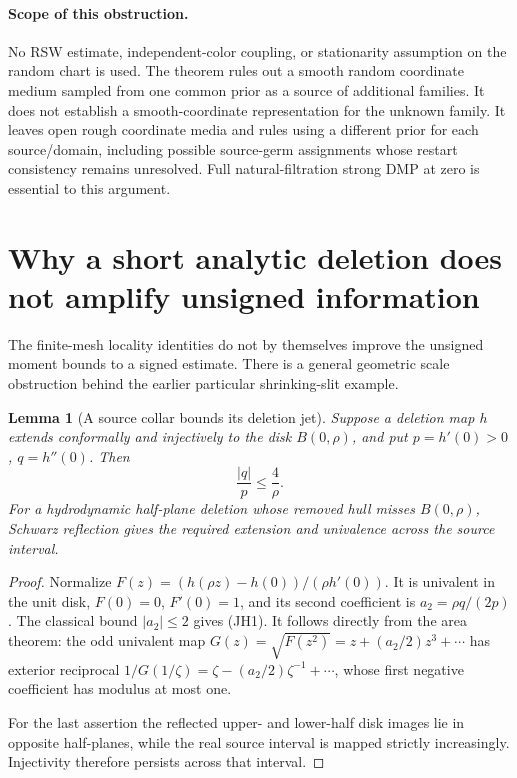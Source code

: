 \documentclass[11pt]{article}
\newtheorem{lemma}[theorem]{Lemma}
\theoremstyle{definition}\newtheorem{definition}[theorem]{Definition}
\theoremstyle{remark}\newtheorem{remark}[theorem]{Remark}
\begin{document}
\paragraph{Scope of this obstruction.}
No RSW estimate, independent-color coupling, or stationarity assumption
on the random chart is used. The theorem rules out a smooth random
coordinate medium sampled from one common prior as a source of additional
families. It does not establish a smooth-coordinate representation for
the unknown family. It leaves open rough coordinate media and rules
using a different prior for each source/domain, including possible
source-germ assignments whose restart consistency remains unresolved.
Full natural-filtration strong DMP at zero is essential to this argument.



\section{Why a short analytic deletion does not amplify unsigned information}
\label{sec:unsigned-jet-horizon}

The finite-mesh locality identities do not by themselves improve the
unsigned moment bounds to a signed estimate. There is a general geometric
scale obstruction behind the earlier particular shrinking-slit example.

\begin{lemma}[A source collar bounds its deletion jet]
\label{lem:deletion-jet-collar}
Suppose a deletion map $h$ extends conformally and injectively to the
disk $B(0,\rho)$, and put $p=h'(0)>0$, $q=h''(0)$. Then
\[
 \frac{|q|}{p}\le\frac4\rho.
 \tag{JH1}
\]
For a hydrodynamic half-plane deletion whose removed hull misses
$B(0,\rho)$, Schwarz reflection gives the required extension and
univalence across the source interval.
\end{lemma}
\begin{proof}
Normalize $F(z)=(h(\rho z)-h(0))/(\rho h'(0))$. It is univalent in the
unit disk, $F(0)=0$, $F'(0)=1$, and its second coefficient is
$a_2=\rho q/(2p)$. The classical bound $|a_2|\le2$ gives (JH1).
It follows directly from the area theorem: the odd univalent map
$G(z)=\sqrt{F(z^2)}=z+(a_2/2)z^3+\cdots$ has exterior reciprocal
$1/G(1/\zeta)=\zeta-(a_2/2)\zeta^{-1}+\cdots$, whose first negative
coefficient has modulus at most one.

For the last assertion the reflected upper- and lower-half disk images
lie in opposite half-planes, while the real source interval is mapped
strictly increasingly. Injectivity therefore persists across that
interval.
\end{proof}
\end{document}
